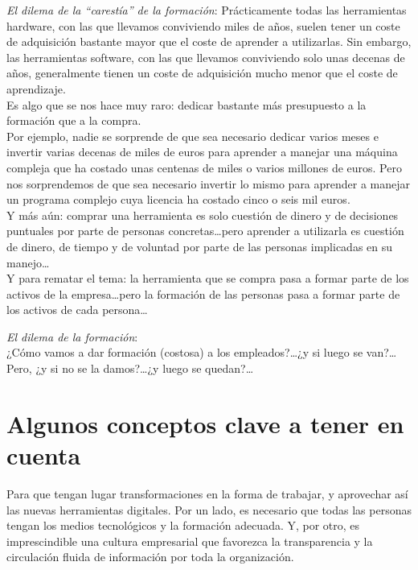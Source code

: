 \documentclass[spanish,12pt,a4paper,final,oneside]{book}
\begin{document}
\vspace{0.5cm}

\textit{El dilema de la ``carestía'' de la formación}: Prácticamente todas las herramientas hardware, con las que llevamos conviviendo miles de años, suelen tener un coste de adquisición bastante mayor que el coste de aprender a utilizarlas. Sin embargo, las herramientas software, con las que llevamos conviviendo solo unas decenas de años, generalmente tienen un coste de adquisición mucho menor que el coste de aprendizaje. 
\\Es algo que se nos hace muy raro: dedicar bastante más presupuesto a la formación que a la compra.
\\Por ejemplo, nadie se sorprende de que sea necesario dedicar varios meses e invertir varias decenas de miles de euros para aprender a manejar una máquina compleja que ha costado unas centenas de miles o varios millones de euros. Pero nos sorprendemos de que sea necesario invertir lo mismo para aprender a manejar un programa complejo cuya licencia ha costado cinco o seis mil euros.
\\Y más aún: comprar una herramienta es solo cuestión de dinero y de decisiones puntuales por parte de personas concretas\ldots pero aprender a utilizarla es cuestión de dinero, de tiempo y de voluntad por parte de las personas implicadas en su manejo\ldots
\\Y para rematar el tema: la herramienta que se compra pasa a formar parte de los activos de la empresa\ldots pero la formación de las personas pasa a formar parte de los activos de cada persona\ldots

\vspace{0.5cm}

\textit{El dilema de la formación}:
\\¿Cómo vamos a dar formación (costosa) a los empleados?\ldots ¿y si luego se van?\ldots
\\Pero, ¿y si no se la damos?\ldots ¿y luego se quedan?\ldots


\section{Algunos conceptos clave a tener en cuenta}
Para que tengan lugar transformaciones en la forma de trabajar, y aprovechar así las nuevas herramientas digitales. Por un lado, es necesario que todas las personas tengan los medios tecnológicos y la formación adecuada. Y, por otro, es imprescindible una cultura empresarial que favorezca la transparencia y la circulación fluida de información por toda la organización.
\end{document}
